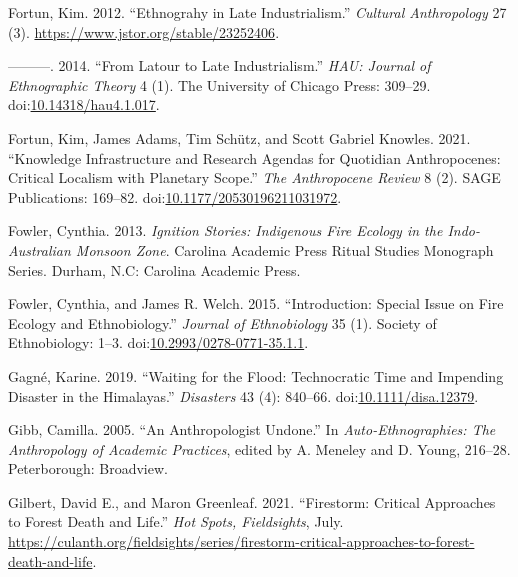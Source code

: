 \documentclass[
]{article}
\newlength{\cslhangindent}
\newenvironment{CSLReferences}[2] %
 {\begin{list}{}{%
  \setlength{\itemindent}{0pt}
  \setlength{\leftmargin}{0pt}
  \setlength{\parsep}{0pt}
  \ifodd #1
   \setlength{\leftmargin}{\cslhangindent}
   \setlength{\itemindent}{-1\cslhangindent}
  \fi
  \setlength{\itemsep}{#2\baselineskip}}}
 {\end{list}}
\begin{document}
\begin{CSLReferences}{1}{0}
Fortun, Kim. 2012. {``Ethnograhy in {Late Industrialism}.''} \emph{Cultural Anthropology} 27 (3). \url{https://www.jstor.org/stable/23252406}.

---------. 2014. {``From {Latour} to Late Industrialism.''} \emph{HAU: Journal of Ethnographic Theory} 4 (1). The University of Chicago Press: 309--29. doi:\href{https://doi.org/10.14318/hau4.1.017}{10.14318/hau4.1.017}.

Fortun, Kim, James Adams, Tim Schütz, and Scott Gabriel Knowles. 2021. {``Knowledge Infrastructure and Research Agendas for Quotidian {Anthropocenes}: {Critical} Localism with Planetary Scope.''} \emph{The Anthropocene Review} 8 (2). SAGE Publications: 169--82. doi:\href{https://doi.org/10.1177/20530196211031972}{10.1177/20530196211031972}.

Fowler, Cynthia. 2013. \emph{Ignition Stories: Indigenous Fire Ecology in the {Indo-Australian} Monsoon Zone}. Carolina {Academic Press} Ritual Studies Monograph Series. Durham, N.C: Carolina Academic Press.

Fowler, Cynthia, and James R. Welch. 2015. {``Introduction: {Special Issue} on {Fire Ecology} and {Ethnobiology}.''} \emph{Journal of Ethnobiology} 35 (1). Society of Ethnobiology: 1--3. doi:\href{https://doi.org/10.2993/0278-0771-35.1.1}{10.2993/0278-0771-35.1.1}.

Gagné, Karine. 2019. {``Waiting for the Flood: Technocratic Time and Impending Disaster in the {Himalayas}.''} \emph{Disasters} 43 (4): 840--66. doi:\href{https://doi.org/10.1111/disa.12379}{10.1111/disa.12379}.

Gibb, Camilla. 2005. {``An {Anthropologist Undone}.''} In \emph{Auto-{Ethnographies}: The {Anthropology} of {Academic Practices}}, edited by A. Meneley and D. Young, 216--28. Peterborough: Broadview.

Gilbert, David E., and Maron Greenleaf. 2021. {``Firestorm: {Critical Approaches} to {Forest Death} and {Life}.''} \emph{Hot Spots, Fieldsights}, July. \url{https://culanth.org/fieldsights/series/firestorm-critical-approaches-to-forest-death-and-life}.


\end{CSLReferences}
\end{document}
